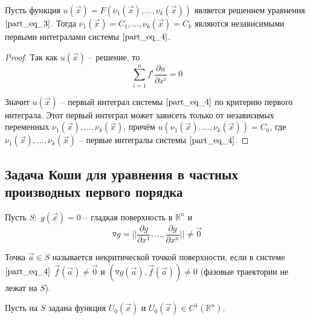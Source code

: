 \documentclass[a4paper, 12pt]{article}
\begin{document}
    \begin{theorem}
        Пусть функция $u(\overrightarrow{x}) = F(\nu_1(\overrightarrow{x}), \dots, \nu_k(\overrightarrow{x}))$ является решением уравнения $\eqref{part_eq_3}$. Тогда $\nu_1(\overrightarrow{x}) = C_1, \dots, \nu_k(\overrightarrow{x}) = C_k$ являются независимыми первыми интегралами системы $\eqref{part_eq_4}$. 
    \end{theorem}
    \begin{proof}
        Так как $u(\overrightarrow{x})$ -- решение, то 
        \begin{equation*}
            \sum \limits_{i = 1}^{n} f^i \frac{\partial u}{\partial x^i} = 0
        \end{equation*}

        Значит $u(\overrightarrow{x})$ -- первый интеграл системы $\eqref{part_eq_4}$ по критерию первого интеграла. Этот первый интеграл может зависеть только от независимых переменных $\nu_1(\overrightarrow{x}), \dots, \nu_k(\overrightarrow{x})$, причём $u(\nu_1(\overrightarrow{x}), \dots, \nu_k(\overrightarrow{x})) = C_0$, где $\nu_1(\overrightarrow{x}), \dots, \nu_k(\overrightarrow{x})$ -- первые интегралы системы $\eqref{part_eq_4}$.
    \end{proof}

    \subsection{Задача Коши для уравнения в частных производных первого порядка}

    Пусть $S: \; g(\overrightarrow{x}) = 0$ -- гладкая поверхность в $\mathbb{R}^n$ и 
    \begin{equation*}
        \triangledown g = \bigg| \bigg| \frac{\partial g}{\partial x^{1}}, \dots, \frac{\partial g}{\partial x^{n}} \bigg| \bigg| \neq \overrightarrow{0}
    \end{equation*}

    \begin{definition}
        Точка $\overrightarrow{a} \in S$ называется некритической точкой поверхности, если в системе $\eqref{part_eq_4}$ $\overrightarrow{f}(\overrightarrow{a}) \neq \overrightarrow{0}$ и $(\triangledown g(\overrightarrow{a}), \overrightarrow{f}(\overrightarrow{a})) \neq 0$ (фазовые траектории не лежат на $S$).
    \end{definition}

    Пусть на $S$ задана функция $U_0(\overrightarrow{x})$ и $U_0(\overrightarrow{x}) \in C^1(\mathbb{R}^n)$.
\end{document}
